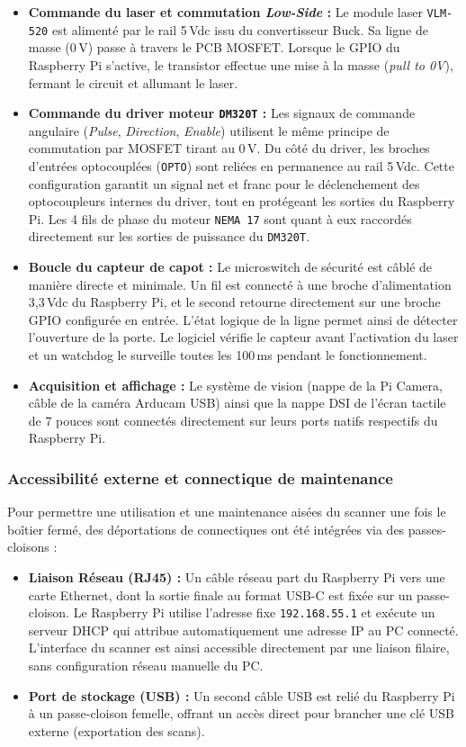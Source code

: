 \begin{itemize}
    \item \textbf{Commande du laser et commutation \textit{Low-Side} :} Le module laser \texttt{VLM-520} est alimenté par le rail 5\,Vdc issu du convertisseur Buck. Sa ligne de masse (0\,V) passe à travers le PCB MOSFET. Lorsque le GPIO du Raspberry Pi s'active, le transistor effectue une mise à la masse (\textit{pull to 0V}), fermant le circuit et allumant le laser.
    \item \textbf{Commande du driver moteur \texttt{DM320T} :} Les signaux de commande angulaire (\textit{Pulse}, \textit{Direction}, \textit{Enable}) utilisent le même principe de commutation par MOSFET tirant au 0\,V. Du côté du driver, les broches d'entrées optocouplées (\texttt{OPTO}) sont reliées en permanence au rail 5\,Vdc. Cette configuration garantit un signal net et franc pour le déclenchement des optocoupleurs internes du driver, tout en protégeant les sorties du Raspberry Pi. Les 4 fils de phase du moteur \texttt{NEMA 17} sont quant à eux raccordés directement sur les sorties de puissance du \texttt{DM320T}.
    \item \textbf{Boucle du capteur de capot :} Le microswitch de sécurité est câblé de manière directe et minimale. Un fil est connecté à une broche d'alimentation 3,3\,Vdc du Raspberry Pi, et le second retourne directement sur une broche GPIO configurée en entrée. L'état logique de la ligne permet ainsi de détecter l'ouverture de la porte. Le logiciel vérifie le capteur avant l'activation du laser et un watchdog le surveille toutes les 100\,ms pendant le fonctionnement.
    \item \textbf{Acquisition et affichage :} Le système de vision (nappe de la Pi Camera, câble de la caméra Arducam USB) ainsi que la nappe DSI de l'écran tactile de 7 pouces sont connectés directement sur leurs ports natifs respectifs du Raspberry Pi.
\end{itemize}

\subsubsection{Accessibilité externe et connectique de maintenance}

Pour permettre une utilisation et une maintenance aisées du scanner une fois le boîtier fermé, des déportations de connectiques ont été intégrées via des passes-cloisons :
\begin{itemize}
    \item \textbf{Liaison Réseau (RJ45) :} Un câble réseau part du Raspberry Pi vers une carte Ethernet, dont la sortie finale au format USB-C est fixée sur un passe-cloison. Le Raspberry Pi utilise l'adresse fixe \texttt{192.168.55.1} et exécute un serveur DHCP qui attribue automatiquement une adresse IP au PC connecté. L'interface du scanner est ainsi accessible directement par une liaison filaire, sans configuration réseau manuelle du PC.
    \item \textbf{Port de stockage (USB) :} Un second câble USB est relié du Raspberry Pi à un passe-cloison femelle, offrant un accès direct pour brancher une clé USB externe (exportation des scans).
\end{itemize}

